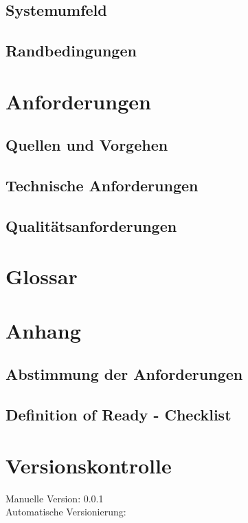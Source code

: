 \documentclass[11pt]{scrreprt}
\begin{document}
\subsection{Systemumfeld}
\subsection{Randbedingungen}
\section{Anforderungen}
\subsection{Quellen und Vorgehen}
\subsection{Technische Anforderungen}
\subsection{Qualitätsanforderungen}
\section{Glossar}
\listoffigures
\listoftables

\section{Anhang}

\subsection{Abstimmung der Anforderungen}
\subsection{Definition of Ready - Checklist}
\section{Versionskontrolle}
Manuelle Version: 0.0.1
\\

\noindent
Automatische Versionierung:
%

\immediate{} 

\immediate{} 
\end{document}
